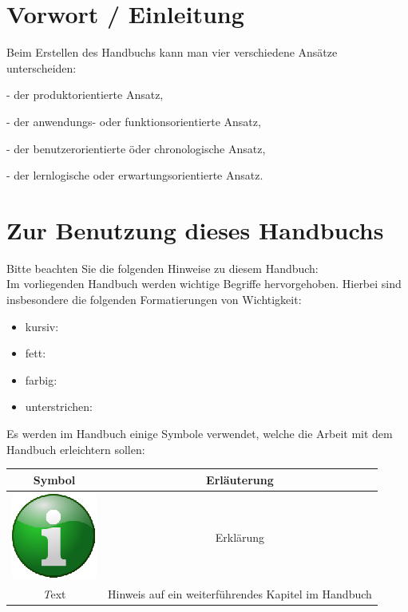 \documentclass[10pt]{scrreprt}
\newcommand{\textref}[1]{\mbox{\raisebox{0.1ex}{\small$\rightarrow$ }\textit{#1}}}
\begin{document}
\pagebreak
\rmfamily
\tableofcontents


\chapter{Vorwort / Einleitung}

Beim Erstellen des Handbuchs kann man vier verschiedene Ansätze unterscheiden:

- der produktorientierte Ansatz,

- der anwendungs- oder funktionsorientierte Ansatz,

- der benutzerorientierte öder chronologische Ansatz,

- der lernlogische oder erwartungsorientierte Ansatz.


\chapter{Zur Benutzung dieses Handbuchs}
Bitte beachten Sie die folgenden Hinweise zu diesem Handbuch:\\

Im vorliegenden Handbuch werden wichtige Begriffe hervorgehoben. Hierbei sind insbesondere die folgenden Formatierungen von Wichtigkeit:

\begin{itemize}
\item kursiv: 
\item fett:
\item farbig:
\item unterstrichen:
\end{itemize}

Es werden im Handbuch einige Symbole verwendet, welche die Arbeit mit dem Handbuch erleichtern sollen:

\begin{tabular}{|c|c|}
\hline 
Symbol & Erläuterung \\ 
\hline
\hline
\includegraphics[scale=0.5]{images/info.eps} & Erklärung \\ 
\hline
\textref Text & Hinweis auf ein weiterführendes Kapitel im Handbuch \\
\hline
\end{tabular} 
\end{document}
